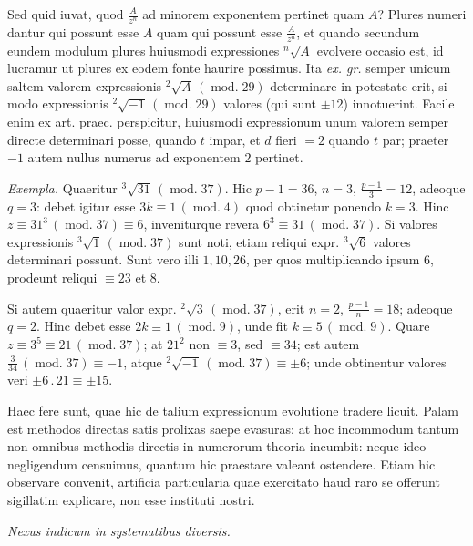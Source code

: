 Sed quid iuvat, quod $\frac{A}{z^n}$ ad minorem exponentem pertinet quam $A$? Plures numeri dantur qui possunt esse $A$ quam qui possunt esse $\frac{A}{z^n}$, et quando secundum eundem modulum plures huiusmodi expressiones ${}^{n}\!\surd{A}$ evolvere occasio est, id lucramur ut plures ex eodem fonte haurire possimus. Ita \emph{ex. gr.} semper unicum saltem valorem expressionis ${}^{2}\!\surd{A}\,(\operatorname{mod.}29)$ determinare in potestate erit,
si modo expressionis ${}^{2}\!\surd{-1}\,(\operatorname{mod.}29)$ valores (qui sunt $\pm12$) innotuerint. Facile enim ex art. praec. perspicitur, huiusmodi expressionum unum valorem semper directe determinari posse, quando $t$ impar, et $d$ fieri $=2$ quando $t$ par; praeter $-1$ autem nullus numerus ad exponentem $2$ pertinet.

\emph{Exempla.} Quaeritur ${}^{3}\!\surd{31}\,(\operatorname{mod.}37)$. Hic $p-1=36$, $n=3$, $\frac{p-1}{3}=12$, adeoque $q=3$: debet igitur esse $3k\equiv1\,(\operatorname{mod.}4)$ quod obtinetur ponendo $k=3$. Hinc $z\equiv31^3\,(\operatorname{mod.}37)\equiv6$, inveniturque revera $6^3\equiv31\,(\operatorname{mod.}37)$. Si valores expressionis ${}^{3}\!\surd{1}\,(\operatorname{mod.}37)$ sunt noti, etiam reliqui expr. ${}^{3}\!\surd{6}$ valores determinari possunt. Sunt vero illi $1,10,26$, per quos multiplicando ipsum $6$, prodeunt reliqui $\equiv23$ et $8$.

Si autem quaeritur valor expr. ${}^{2}\!\surd{3}\,(\operatorname{mod.}37)$, erit $n=2$, $\frac{p-1}{n}=18$; adeoque $q=2$. Hinc debet esse $2k\equiv1\,(\operatorname{mod.}9)$, unde fit $k\equiv5\,(\operatorname{mod.}9)$. Quare $z\equiv3^5\equiv21\,(\operatorname{mod.}37)$; at $21^2$ non $\equiv3$, sed $\equiv34$; est autem $\frac{3}{34}\,(\operatorname{mod.}37)\equiv-1$, atque ${}^{2}\!\surd{-1}\,(\operatorname{mod.}37)\equiv\pm6$; unde obtinentur valores veri $\pm6\,.\,21\equiv\pm15$.

Haec fere sunt, quae hic de talium expressionum evolutione tradere licuit. Palam est methodos directas satis prolixas saepe evasuras: at hoc incommodum tantum non omnibus methodis directis in numerorum theoria incumbit: neque ideo negligendum censuimus, quantum hic praestare valeant ostendere. Etiam hic observare convenit, artificia particularia quae exercitato haud raro se offerunt sigillatim explicare, non esse instituti nostri.

\begin{center}\emph{Nexus indicum in systematibus diversis.}\end{center}

